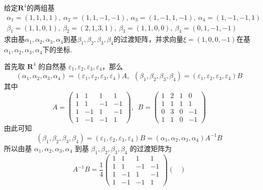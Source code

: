 \begin{exercise}
\begin{exgroup}
        \item 给定$\mathbf{R}^4$的两组基
        \begin{gather*}
            \alpha_1=(1,1,1,1),\ \alpha_2=(1,1,-1,-1),\ \alpha_3=(1,-1,1,-1),\ \alpha_4=(1,-1,-1,1) \\
            \beta_1=(1,1,0,1),\ \beta_2=(2,1,3,1),\ \beta_3=(1,1,0,0),\ \beta_4=(0,1,-1,-1)
        \end{gather*}
        求由基$\alpha_1,\alpha_2,\alpha_3,\alpha_4$到基$\beta_1,\beta_2,\beta_3,\beta_4$的过渡矩阵，并求向量$\xi=(1,0,0,-1)$在基$\alpha_1,\alpha_2,\alpha_3,\alpha_4$下的坐标.
        \begin{answer}
            首先取 $ \mathbf{R}^4 $ 的自然基 $\varepsilon_1, \varepsilon_2, \varepsilon_3, \varepsilon_4$，那么
            \[ (\alpha_1, \alpha_2, \alpha_3, \alpha_4) = (\varepsilon_1, \varepsilon_2, \varepsilon_3, \varepsilon_4) A,\enspace (\beta_1, \beta_2, \beta_3, \beta_4) = (\varepsilon_1, \varepsilon_2, \varepsilon_3, \varepsilon_4) B \]
            其中
            \[ A = \begin{pmatrix}
                    1 & 1  & 1  & 1  \\
                    1 & 1  & -1 & -1 \\
                    1 & -1 & 1  & -1 \\
                    1 & -1 & -1 & 1
                \end{pmatrix},\enspace B = \begin{pmatrix}
                    1 & 2 & 1 & 0  \\
                    1 & 1 & 1 & 1  \\
                    0 & 3 & 0 & -1 \\
                    1 & 1 & 0 & -1
                \end{pmatrix} \]
            由此可知
            \[ (\beta_1, \beta_2, \beta_3, \beta_4) = (\varepsilon_1, \varepsilon_2, \varepsilon_3, \varepsilon_4) B = (\alpha_1, \alpha_2, \alpha_3, \alpha_4) A^{-1} B \]
            所以由基 $ \alpha_1, \alpha_2, \alpha_3, \alpha_4 $ 到基 $ \beta_1, \beta_2, \beta_3, \beta_4 $ 的过渡矩阵为
            \[ A^{-1} B = \frac{1}{4} \begin{pmatrix}
                    1 & 1  & 1  & 1  \\
                    1 & 1  & -1 & -1 \\
                    1 & -1 & 1  & -1 \\
                    1 & -1 & -1 & 1
                \end{pmatrix} \begin{pmatrix}

\end{pmatrix}\]
\end{answer}
\end{exgroup}
\end{exercise}

